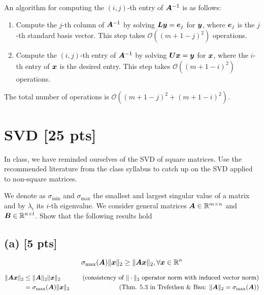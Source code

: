 \documentclass[twoside,10pt]{article}
\begin{document}
\quad An algorithm for computing the $(i, j)$-th entry of $\bm{A}^{-1}$ is as follows:

\begin{enumerate}
\item Compute the $j$-th column of $\bm{A}^{-1}$ by solving $\bm{L} \bm{y} = \bm{e}_j$ for $\bm{y}$, where $\bm{e}_j$ is the $j$-th standard basis vector.
This step takes $\mathcal{O}(\left(m + 1 - j\right)^2)$ operations.
\item Compute the $(i, j)$-th entry of $\bm{A}^{-1}$ by solving $\bm{U} \bm{x} = \bm{y}$ for $\bm{x}$, where the $i$-th entry of $\bm{x}$ is the desired entry.
This step takes $\mathcal{O}(\left(m + 1 - i\right)^2)$ operations.
\end{enumerate}

\quad The total number of operations is $\mathcal{O}(\left(m + 1 - j\right)^2 + \left(m + 1 - i\right)^2)$.

\section{SVD [25 pts]}
In class, we have reminded ourselves of the SVD of square matrices. 
Use the recommended literature from the class syllabus to catch up on the SVD applied to non-square matrices. 

We denote as $\sigma_{\mathrm{min}}$ and $\sigma_{\mathrm{max}}$ the smallest and largest singular value of a matrix and by $\lambda_{i}$ its $i$-th eigenvalue. 
We consider general matrices $\bm{A} \in \mathbb{R}^{m \times n}$ and $\bm{B} \in \mathbb{R}^{n \times l}$.
Show that the following results hold 

\subsection*{(a) [5 pts]}
  \begin{equation*}
    \sigma_{\mathrm{max}}(\bm{A}) \|\bm{x}\|_2 \geq \|\bm{A} \bm{x}\|_2, \forall \bm{x} \in \mathbb{R}^n
  \end{equation*}

\begin{align*}
 \|\bm{A} \bm{x}\|_2 &\leq \|\bm{A}\|_2\|\bm{x}\|_2 &\quad\text{(consistency of $\|\cdot\|_2$ operator norm with induced vector norm)}\\
 &= \sigma_{\mathrm{max}}(\bm{A})\|\bm{x}\|_2 &\quad\text{(Thm. 5.3 in Trefethen \& Bau: $\|\bm{A}\|_2 = \sigma_{\mathrm{max}}(\bm{A})$)}
\end{align*}
\end{document}
